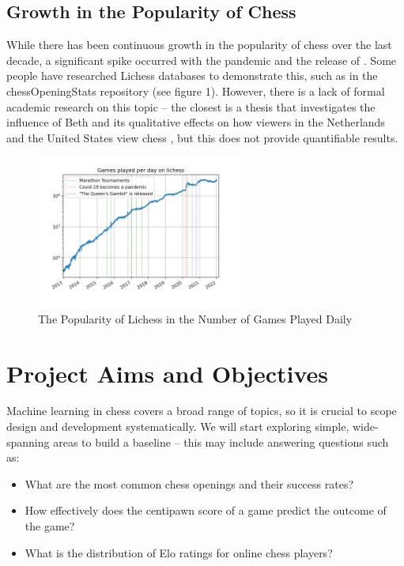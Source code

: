 \documentclass[%
 superscriptaddress,
showpacs,preprintnumbers,
 amsmath,
 amssymb,
 aps,
 pra,
showkeys,
onecolumn,
notitlepage,
11pt,
tightenlines      %
]{revtex4-1}
\begin{document}
\subsection{Growth in the Popularity of Chess}
While there has been continuous growth in the popularity of chess over the last decade, a significant spike occurred with the pandemic and the release of . Some people have researched Lichess databases to demonstrate this, such as in the chessOpeningStats repository (see figure 1). However, there is a lack of formal academic research on this topic -- the closest is a thesis that investigates the influence of Beth and its qualitative effects on how viewers in the Netherlands and the United States view chess \cite{lowie2021big}, but this does not provide quantifiable results.

\begin{figure}[h]
    \caption{The Popularity of Lichess in the Number of Games Played Daily \cite{chessOpeningStats}}
    \begin{center}
    \includegraphics[width=0.6\textwidth]{images/Lichess Number of Games Played Per Day.png}
    \end{center}
\end{figure}

\section{Project Aims and Objectives}
Machine learning in chess covers a broad range of topics, so it is crucial to scope design and development systematically. We will start exploring simple, wide-spanning areas to build a baseline -- this may include answering questions such as:

\begin{itemize}
    \setlength\itemsep{-0.5em}
    \item What are the most common chess openings and their success rates?
    \item How effectively does the centipawn score of a game predict the outcome of the game?
    \item What is the distribution of Elo ratings for online chess players?
\end{itemize}
\end{document}
